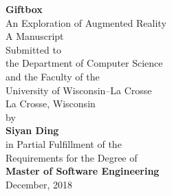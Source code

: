 \begin{titlepage}
	\begin{center}
		\vspace*{0.5in}
		\begin{doublespace}
			\LARGE \textbf{Giftbox} \\
			\large An Exploration of Augmented Reality\\
			\vspace*{1in}
			\normalsize
			A Manuscript \\
			Submitted to \\
			the Department of Computer Science \\
			and the Faculty of the\\
			University of Wisconsin--La Crosse \\
			La Crosse, Wisconsin \\
			\vspace*{0.5in}
			by \\
			\large
			\textbf{Siyan Ding} \\

			\vspace*{0.5in}
			\normalsize
			in Partial Fulfillment of the \\
			Requirements for the Degree of\\
			\Large{\textbf{Master of Software Engineering}} \\
			\normalsize
			December, 2018
		\end{doublespace}
	\end{center}
\end{titlepage}
